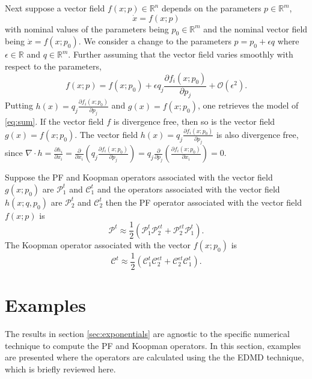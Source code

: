 \documentclass[pdflatex,sn-mathphys]{sn-jnl}%
\theoremstyle{thmstyleone}%
\theoremstyle{thmstyletwo}%
\theoremstyle{thmstylethree}%
\begin{document}
Next suppose a vector field $f(x;p) \in \mathbb{R}^n$ depends on the parameters $p \in \mathbb{R}^m$, 
\begin{equation}
    \dot{x} = f(x;p)
\end{equation}
with  nominal values of the parameters being $p_0 \in \mathbb{R}^m$ and the nominal vector field being $\dot{x} = f(x;p_0)$. We consider a change to the parameters $p = p_0 + \epsilon q$ where $\epsilon \in \mathbb{R}$ and $q \in \mathbb{R}^m$. Further assuming that the vector field varies smoothly with respect to the parameters, 
\[
f(x;p) = f(x;p_0) + \epsilon q_j\frac{\partial f_i(x;p_0)}{\partial p_j} + \mathcal{O}(\epsilon^2).
\]
Putting $h(x) = q_j\frac{\partial f_i(x;p_0)}{\partial p_j}$ and $g(x) = f(x;p_0)$, one retrieves the model of \eqref{eq:sum}. If the vector field $f$ is divergence free, then so is the vector field $g(x)= f(x;p_0)$. The vector field $h(x) = q_j\frac{\partial f_i(x;p_0)}{\partial p_j}$ is also divergence free, since $\nabla \cdot h = \frac{\partial h_i}{\partial x_i} = \frac{\partial}{\partial x_i}\left(q_j\frac{\partial f_i(x;p_0)}{\partial p_j} \right) = q_j \frac{\partial}{\partial p_j}\left( \frac{\partial f_i(x;p_0)}{\partial x_i}\right) = 0$. 

Suppose the PF and Koopman operators associated with the vector field $g(x;p_0)$ are $\mathcal{P}_1^t$ and $\mathcal{C}_1^t$ and the operators associated with the vector field $h(x;q,p_0)$ are $\mathcal{P}_2^t$ and $\mathcal{C}_2^t$ then the PF operator associated with the vector field $f(x;p)$ is
\begin{equation}\label{eq:PF_param}
    \mathcal{P}^t \approx \frac{1}{2}\left(\mathcal{P}_1^t\mathcal{P}_2^{\epsilon t} + \mathcal{P}_2^{\epsilon t} \mathcal{P}_1^t\right).
\end{equation}
The Koopman operator associated with the vector $f(x;p_0)$ is 
\begin{equation}\label{eq:Koopman_param}
    \mathcal{C}^t \approx \frac{1}{2}\left(\mathcal{C}_1^t\mathcal{C}_2^{\epsilon t} + \mathcal{C}_2^{\epsilon t} \mathcal{C}_1^t\right).
\end{equation}

\section{Examples  }\label{sec:examples}
The results in section \ref{sec:exponentials} are agnostic to the specific numerical technique to compute the PF and Koopman operators. In this section, examples are presented where the operators are calculated using the the EDMD technique, which is briefly reviewed here.
\end{document}
